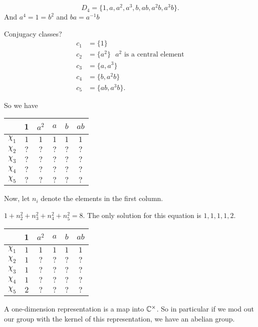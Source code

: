 \[
D_4 = \{1, a, a^2, a^3, b, ab, a^2b, a^3b\} 
.\] 
And $a^4 = 1 = b^2$ and $ba = a^{-1}b$

Conjugacy classes?
\begin{align*}
    c_1 &= \{1\} \\
    c_2 &= \{a^2\}  \text{ $a^2$ is a central element}\\
    c_3 &= \{a, a^{3}\} \\
    c_4 &= \{b, a^2b\} \\
    c_5 &= \{ab, a^3b\} 
.\end{align*}

So we have
 
\begin{center}\begin{tabular}{cccccc}
     & 1 & $a^2$ & $a$ &  $b$ &  $ab$\\ \hline
    $\chi_{1}$ & $1$ & $1$ & $1$ & $1$ & $1$  \\
    $\chi_{2}$ & $?$ & $?$ & $?$ & $?$ & $?$  \\
    $\chi_{3}$ & $?$ & $?$ & $?$ & $?$ & $?$  \\
    $\chi_{4}$ & $?$ & $?$ & $?$ & $?$ & $?$  \\
    $\chi_{5}$ & $?$ & $?$ & $?$ & $?$ & $?$ 
\end{tabular}\end{center}

Now, let $n_i$ denote the elements in the first column.

$1 + n_2^2 + n_3^2 + n_4^2 + n_5^2 = 8$.
The only solution for this equation is $1, 1, 1, 1, 2$. 


\begin{center}\begin{tabular}{cccccc}
    & 1 & $a^2$ & $a$ &  $b$ &  $ab$\\ \hline
    $\chi_{1}$ & $1$ & $1$ & $1$ & $1$ & $1$  \\
    $\chi_{2}$ & $1$ & $?$ & $?$ & $?$ & $?$  \\
    $\chi_{3}$ & $1$ & $?$ & $?$ & $?$ & $?$  \\
    $\chi_{4}$ & $1$ & $?$ & $?$ & $?$ & $?$  \\
    $\chi_{5}$ & $2$ & $?$ & $?$ & $?$ & $?$ 
\end{tabular}\end{center}

A one-dimension representation is a map into $\mathbb{C}^{\times }$. So in particular if we mod out our group with the kernel of this representation, we have an abelian group.

